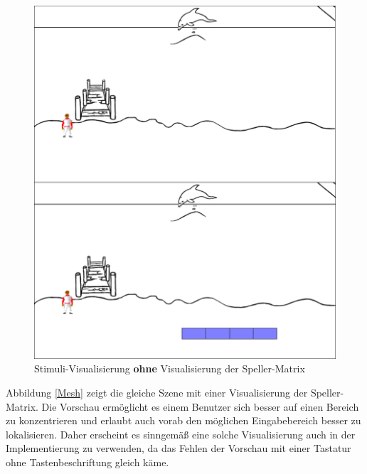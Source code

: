 \begin{figure}[h!]
\begin{center}
\includegraphics[scale=0.225]{images/NoMesh.png}
\caption{Stimuli-Visualisierung \textbf{ohne} Visualisierung der Speller-Matrix}
\label{NoMesh}
\end{center}
\end{figure}

\pagebreak

Abbildung \ref{Mesh} zeigt die gleiche Szene mit einer Visualisierung der Speller-Matrix.
Die Vorschau ermöglicht es einem Benutzer sich besser auf einen Bereich zu konzentrieren und erlaubt auch vorab den möglichen Eingabebereich besser zu lokalisieren.
Daher erscheint es sinngemäß eine solche Visualisierung auch in der Implementierung zu verwenden, da das Fehlen der Vorschau mit einer Tastatur ohne Tastenbeschriftung gleich käme.\\

